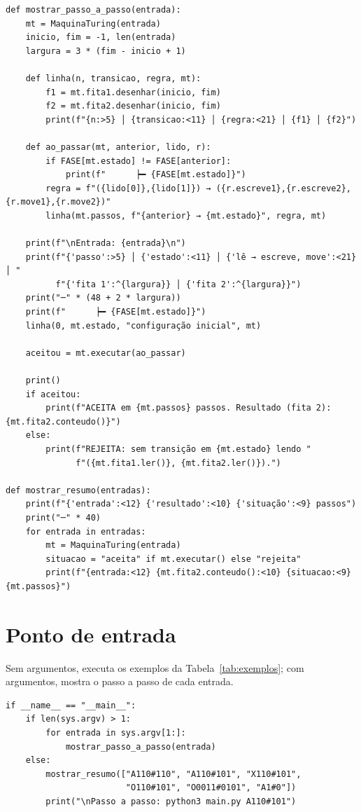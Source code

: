 \documentclass[report, 12pt]{uftreport}
\begin{document}
\begin{lstlisting}[style=python, caption={Exibição da execução}, label={lst:print}]
def mostrar_passo_a_passo(entrada):
    mt = MaquinaTuring(entrada)
    inicio, fim = -1, len(entrada)
    largura = 3 * (fim - inicio + 1)

    def linha(n, transicao, regra, mt):
        f1 = mt.fita1.desenhar(inicio, fim)
        f2 = mt.fita2.desenhar(inicio, fim)
        print(f"{n:>5} │ {transicao:<11} │ {regra:<21} │ {f1} │ {f2}")

    def ao_passar(mt, anterior, lido, r):
        if FASE[mt.estado] != FASE[anterior]:
            print(f"      ┝━ {FASE[mt.estado]}")
        regra = f"({lido[0]},{lido[1]}) → ({r.escreve1},{r.escreve2},{r.move1},{r.move2})"
        linha(mt.passos, f"{anterior} → {mt.estado}", regra, mt)

    print(f"\nEntrada: {entrada}\n")
    print(f"{'passo':>5} │ {'estado':<11} │ {'lê → escreve, move':<21} │ "
          f"{'fita 1':^{largura}} │ {'fita 2':^{largura}}")
    print("─" * (48 + 2 * largura))
    print(f"      ┝━ {FASE[mt.estado]}")
    linha(0, mt.estado, "configuração inicial", mt)

    aceitou = mt.executar(ao_passar)

    print()
    if aceitou:
        print(f"ACEITA em {mt.passos} passos. Resultado (fita 2): {mt.fita2.conteudo()}")
    else:
        print(f"REJEITA: sem transição em {mt.estado} lendo "
              f"({mt.fita1.ler()}, {mt.fita2.ler()}).")

def mostrar_resumo(entradas):
    print(f"{'entrada':<12} {'resultado':<10} {'situação':<9} passos")
    print("─" * 40)
    for entrada in entradas:
        mt = MaquinaTuring(entrada)
        situacao = "aceita" if mt.executar() else "rejeita"
        print(f"{entrada:<12} {mt.fita2.conteudo():<10} {situacao:<9} {mt.passos}")
\end{lstlisting}

\section{Ponto de entrada}

Sem argumentos, executa os exemplos da Tabela~\ref{tab:exemplos}; com argumentos, mostra o passo a passo de cada entrada.

\begin{lstlisting}[style=python, caption={Ponto de entrada}, label={lst:main}]
if __name__ == "__main__":
    if len(sys.argv) > 1:
        for entrada in sys.argv[1:]:
            mostrar_passo_a_passo(entrada)
    else:
        mostrar_resumo(["A110#110", "A110#101", "X110#101",
                        "O110#101", "O0011#0101", "A1#0"])
        print("\nPasso a passo: python3 main.py A110#101")
\end{lstlisting}
\end{document}
